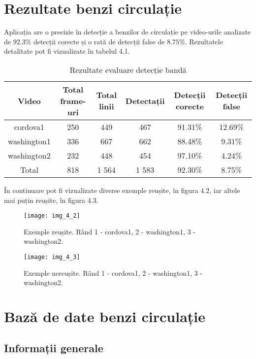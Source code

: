 \section{Rezultate benzi circulație}

Aplicația are o precizie în detecție a benzilor de circulație pe video-urile analizate de $92.3\%$ detecții corecte și o rată de detecții false de $8.75\%$. Rezultatele detalitate pot fi vizualizate în tabelul 4.1.

\begin{table}[h!]
	\centering
	\begin{tabular}{||c | c | c | c | c | c ||} 
		\hline
		Video & Total frame-uri & Total linii & Detectații & Detecții corecte & Detecții false \\ [0.5ex] 
		\hline\hline
		cordova1 & 250 & 449 & 467 & 91.31\% & 12.69\%  \\ 
		washington1 & 336 & 667 & 662 & 88.48\% & 9.31\% \\
		washington2 & 232 & 448 & 454 & 97.10\% & 4.24\%  \\ 
		\hline\hline
		Total & 818 & 1 564 & 1 583 & 92.30\% & 8.75\% \\ [1ex]
		
		\hline
	\end{tabular}
	\caption{Rezultate evaluare detecție bandă}
	\label{table:1}
\end{table}

În continuare pot fi vizualizate diverse exemple reușite, în figura 4.2, iar altele mai puțin reușite, în figura 4.3.

\begin{figure}[!h]
	\centering
	\texttt{[image: img\_4\_2]}
	\caption[Detecție bandă - exemple reușite]{Exemple reușite. Rând 1 - cordova1, 2 - washington1, 3 - washington2.}
\end{figure}
\begin{figure}[!h]
	\centering
	\texttt{[image: img\_4\_3]}
	\caption[Detecție bandă - exemple nereușite]{Exemple nereușite. Rând 1 - cordova1, 2 - washington1, 3 - washington2.}
\end{figure}

\section{Bază de date benzi circulație}
\subsection*{Informații generale}

